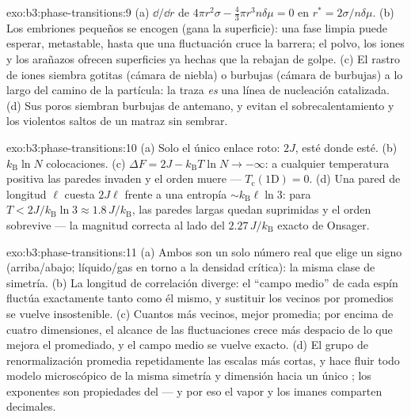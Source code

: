 \begin{solution}{exo:b3:phase-transitions:9}
(a) $\dd/\dd r$ de $4\pi r^2\sigma - \tfrac43\pi r^3n\delta\mu = 0$
en $r^* = 2\sigma/n\delta\mu$. (b) Los embriones pequeños se encogen (gana la
superficie): una fase limpia puede esperar, metastable, hasta que una fluctuación
cruce la barrera; el polvo, los iones y los arañazos ofrecen superficies
ya hechas que la rebajan de golpe. (c) El rastro de iones siembra gotitas (cámara
de niebla) o burbujas (cámara de burbujas) a lo largo del camino de la partícula:
la traza \emph{es} una línea de nucleación catalizada. (d) Sus
poros siembran burbujas de antemano, y evitan el sobrecalentamiento y los violentos
saltos de un matraz sin sembrar.
\end{solution}

\begin{solution}{exo:b3:phase-transitions:10}
(a) Solo el único enlace roto: $2J$, esté donde esté. (b)
$k_{\text{B}}\ln N$ colocaciones. (c) $\Delta F = 2J -
k_{\text{B}}T\ln N \to -\infty$: a cualquier temperatura positiva
las paredes invaden y el orden muere --- $T_{\text{c}}(1\text{D}) = 0$. (d)
Una pared de longitud $\ell$ cuesta $2J\ell$ frente a una entropía
$\sim k_{\text{B}}\ell\ln3$: para $T < 2J/k_{\text{B}}\ln3 \approx
1.8\,J/k_{\text{B}}$, las paredes largas quedan suprimidas y el orden sobrevive
--- la magnitud correcta al lado del
$2.27\,J/k_{\text{B}}$ exacto de Onsager.
\end{solution}

\begin{solution}{exo:b3:phase-transitions:11}
(a) Ambos  son un solo número real que elige un signo
(arriba/abajo; líquido/gas en torno a la densidad crítica): la misma
clase de simetría. (b) La longitud de correlación diverge: el ``campo medio''
de cada espín fluctúa exactamente tanto como él mismo, y
sustituir los vecinos por promedios se vuelve insostenible. (c) Cuantos más
vecinos, mejor promedia; por encima de cuatro dimensiones, el alcance de las
fluctuaciones crece más despacio de lo que mejora el promediado, y el campo medio
se vuelve exacto. (d) El grupo de renormalización promedia repetidamente las
escalas más cortas, y hace fluir todo modelo microscópico de la
misma simetría y dimensión hacia un único ; los exponentes son
propiedades del  --- y por eso el vapor y los imanes
comparten decimales.
\end{solution}

